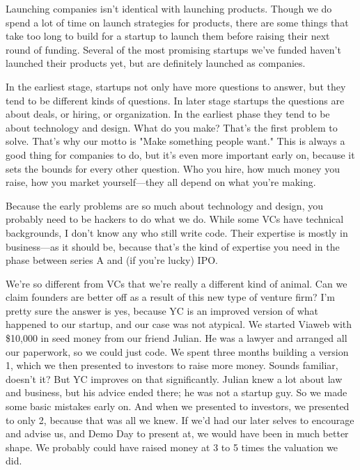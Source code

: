 Launching companies isn't identical
                  with launching products. Though we do spend a lot of time on
                  launch strategies for products, there are some things that
                  take too long to build for a startup to launch them before
                  raising their next round of funding. Several of the most
                  promising startups we've funded haven't launched their
                  products yet, but are definitely launched as companies.

In
                  the earliest stage, startups not only have more questions to
                  answer, but they tend to be different kinds of questions. In
                  later stage startups the questions are about deals, or hiring,
                  or organization. In the earliest phase they tend to be about
                  technology and design. What do you make? That's the first
                  problem to solve. That's why our motto is "Make something
                  people want." This is always a good thing for companies to do,
                  but it's even more important early on, because it sets the
                  bounds for every other question. Who you hire, how much money
                  you raise, how you market yourself---they all depend on
                  what you're making.

Because the early problems are
                  so much about technology and design, you probably need to be
                  hackers to do what we do. While some VCs have technical
                  backgrounds, I don't know any who still write code. Their
                  expertise is mostly in business---as it should be, because
                  that's the kind of expertise you need in the phase between
                  series A and (if you're lucky) IPO.

We're so
                  different from VCs that we're really a different kind of
                  animal. Can we claim founders are better off as a result of
                  this new type of venture firm? I'm pretty sure the answer is
                  yes, because YC is an improved version of what happened to our
                  startup, and our case was not atypical. We started Viaweb with
                  \$10,000 in seed money from our friend Julian. He was a lawyer
                  and arranged all our paperwork, so we could just code. We
                  spent three months building a version 1, which we then
                  presented to investors to raise more money. Sounds familiar,
                  doesn't it? But YC improves on that significantly. Julian knew
                  a lot about law and business, but his advice ended there; he
                  was not a startup guy. So we made some basic mistakes early
                  on. And when we presented to investors, we presented to only
                  2, because that was all we knew. If we'd had our later selves
                  to encourage and advise us, and Demo Day to present at, we
                  would have been in much better shape. We probably could have
                  raised money at 3 to 5 times the valuation we did.

